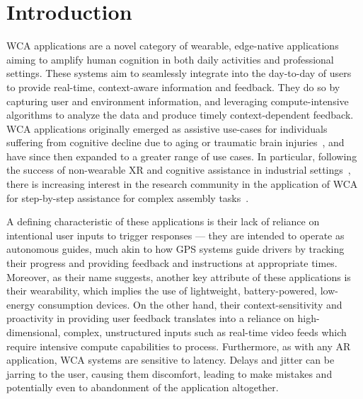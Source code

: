 \section{Introduction}\label{sec:intro}

\acf{WCA} applications are a novel category of wearable, edge-native applications aiming to amplify human cognition in both daily activities and professional settings.
These systems aim to seamlessly integrate into the day-to-day of users to provide real-time, context-aware information and feedback.
They do so by capturing user and environment information, and leveraging compute-intensive algorithms to analyze the data and produce timely context-dependent feedback.
\ac{WCA} applications originally emerged as assistive use-cases for individuals suffering from cognitive decline due to aging or traumatic brain injuries~\cite{Ha2014towards,Satya2019augmenting}, and have since then expanded to a greater range of use cases.
In particular, following the success of non-wearable \ac{XR} and cognitive assistance in industrial settings~\cite{Funk2015Cognitive,Wang2022Comprehensive}, there is increasing interest in the research community in the application of \ac{WCA} for step-by-step assistance for complex assembly tasks~\cite{Chen2017Empirical}.

A defining characteristic of these applications is their lack of reliance on intentional user inputs to trigger responses --- they are intended to operate as autonomous guides, much akin to how \ac{GPS} systems guide drivers by tracking their progress and providing feedback and instructions at appropriate times.
Moreover, as their name suggests, another key attribute of these applications is their wearability, which implies the use of lightweight, battery-powered, low-energy consumption devices.
On the other hand, their context-sensitivity and proactivity in providing user feedback translates into a reliance on high-dimensional, complex, unstructured inputs such as real-time video feeds which require intensive compute capabilities to process.
Furthermore, as with any \ac{AR} application, \ac{WCA} systems are sensitive to latency.
Delays and jitter can be jarring to the user, causing them discomfort, leading to make mistakes and potentially even to abandonment of the application altogether.

